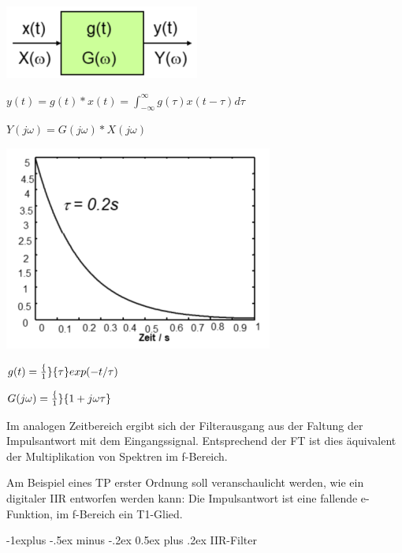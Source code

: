 \documentclass[a4paper]{article}
\makeatletter
\renewcommand{\subsection}{\@startsection{subsection}{2}{0mm}%
 {-1explus -.5ex minus -.2ex}%
 {0.5ex plus .2ex}%
 {\normalfont\normalsize\bfseries}}
\makeatother
\begin{document}
\begin{multicols}{3}
  \begin{itemize*}
    \item \includegraphics[width=.5\linewidth]{Assets/Biosignalverarbeitung-iir-1.png}
    \item $y(t)=g(t)*x(t)=\int_{-\infty}^{\infty} g(\tau)x(t-\tau) d\tau$
    \item $Y(j\omega)=G(j\omega)* X(j\omega)$
    \item \includegraphics[width=.5\linewidth]{Assets/Biosignalverarbeitung-iir-2.png}
    \item $g(t)=\frac\{1\}\{\tau\}exp(-t/\tau)$
    \item $G(j\omega)=\frac\{1\}\{1+j\omega\tau\}$
    \item Im analogen Zeitbereich ergibt sich der Filterausgang aus der Faltung der Impulsantwort mit dem Eingangssignal. Entsprechend der FT ist dies äquivalent der Multiplikation von Spektren im f-Bereich.
    \item Am Beispiel eines TP erster Ordnung soll veranschaulicht werden, wie ein digitaler IIR entworfen werden kann: Die Impulsantwort ist eine fallende e-Funktion, im f-Bereich ein T1-Glied.
  \end{itemize*}

  \subsection{IIR-Filter}\label{iir-filter}


\end{multicols}
\end{document}
